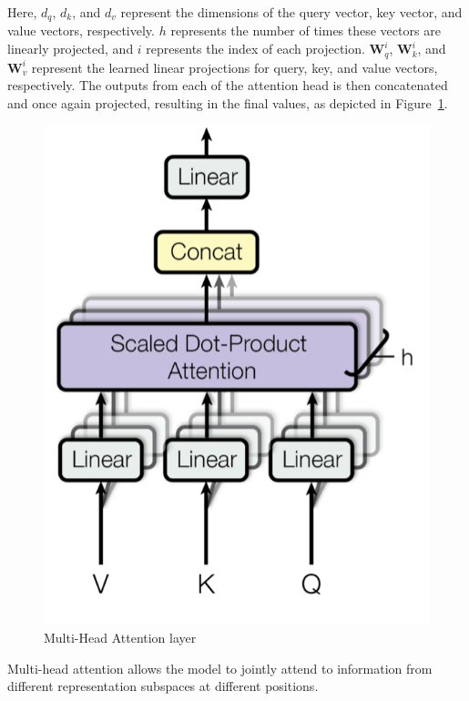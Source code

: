 Here, $d_q$, $d_k$, and $d_v$ represent the dimensions of the query vector, key vector, and value vectors, respectively. $h$ represents the number of times these vectors are linearly projected, and $i$ represents the index of each projection. $\boldsymbol{W}_q^i$, $\boldsymbol{W}_k^i$, and $\boldsymbol{W}_v^i$ represent the learned linear projections for query, key, and value vectors, respectively. The outputs from each of the attention head is then concatenated and once again projected, resulting in the final values, as depicted in Figure~\ref{fig:multi_head}.

\begin{figure}[H]
    \centering
    \includegraphics[scale=0.3]{figures/multi-head-attention.png}
    \caption{Multi-Head Attention layer}
    \label{fig:multi_head}
\end{figure}

Multi-head attention allows the model to jointly attend to information from different representation subspaces at different positions. 

